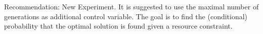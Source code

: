 \begin{frame}
\vspace*{2mm}
\begin{block}{
Recommendation: New Experiment.
}
It is suggested to use the maximal number of generations as additional control variable.
The goal is to find the (conditional) probability that the optimal solution is found
given a resource constraint.
\end{block}
\end{frame}